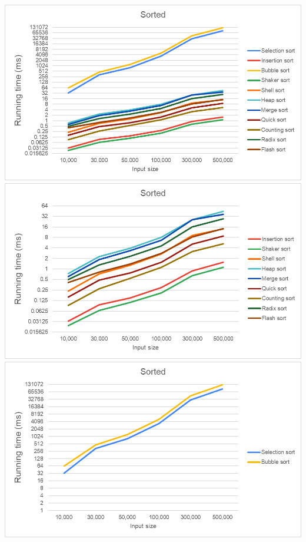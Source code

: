 \includegraphics[width = 1\linewidth]{img/experiment/running time/sorted/1.png}
\includegraphics[width = 1\linewidth]{img/experiment/running time/sorted/2.png}
\includegraphics[width = 1\linewidth]{img/experiment/running time/sorted/3.png}
